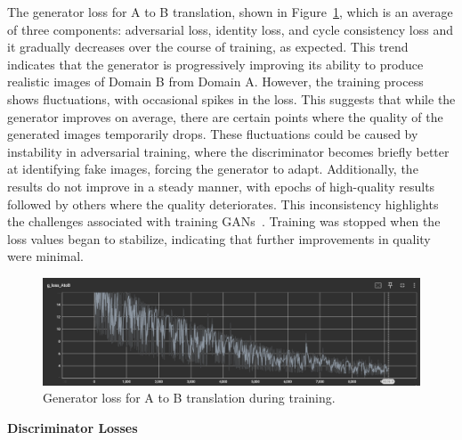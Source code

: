 \documentclass[12pt,DIV14,BCOR12mm,a4paper,footinclude=false,headinclude,parskip=half-,twoside,openright,cleardoublepage=empty,toc=index,bibliography=totoc,listof=totoc]{scrreprt}
\numberwithin{equation}{chapter}
\begin{document}
The generator loss for A to B translation, shown in Figure~\ref{g_loss}, which is an average of three components: adversarial loss, identity loss, and cycle consistency loss and it gradually decreases over the course of training, as expected. This trend indicates that the generator is progressively improving its ability to produce realistic images of Domain B from Domain A. However, the training process shows fluctuations, with occasional spikes in the loss. This suggests that while the generator improves on average, there are certain points where the quality of the generated images temporarily drops. These fluctuations could be caused by instability in adversarial training, where the discriminator becomes briefly better at identifying fake images, forcing the generator to adapt. Additionally, the results do not improve in a steady manner, with epochs of high-quality results followed by others where the quality deteriorates. This inconsistency highlights the challenges associated with training GANs~\cite{saxena2021generative}. Training was stopped when the loss values began to stabilize, indicating that further improvements in quality were minimal.
\begin{figure}
	\centering
	\includegraphics[scale=.51]{../media/g_loss_atob.png}
	\caption{Generator loss for A to B translation during training.}
	\label{g_loss}
\end{figure}

\textbf{Discriminator Losses}
\end{document}
